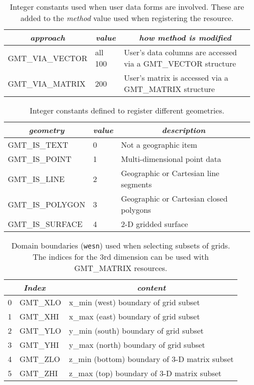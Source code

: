 \documentclass[11pt]{report}
\begin{document}
\begin{table}[h]
\small
\centering
\begin{tabular}{|l|l|l|} \hline
\multicolumn{1}{|c|}{\emph{approach}} & \multicolumn{1}{c|}{\emph{value}} & \multicolumn{1}{c|}{\emph{how method is modified}} \\ \hline
GMT\_VIA\_VECTOR	&all	100	&       User's data columns are accessed via a GMT\_VECTOR structure \\ \hline
GMT\_VIA\_MATRIX	&	200	&       User's matrix is accessed via a GMT\_MATRIX structure \\ \hline
\end{tabular}
\caption{Integer constants used when user data forms are involved.  These are added
to the \emph{method} value used when registering the resource.}
\label{tbl:via}
\end{table}

\begin{table}[h]
\small
\centering
\begin{tabular}{|l|l|l|} \hline
\multicolumn{1}{|c|}{\emph{geometry}} & \multicolumn{1}{c|}{\emph{value}} & \multicolumn{1}{c|}{\emph{description}} \\ \hline
GMT\_IS\_TEXT		&	0	&       Not a geographic item \\ \hline
GMT\_IS\_POINT		&	1	&       Multi-dimensional point data \\ \hline
GMT\_IS\_LINE		&	2	&       Geographic or Cartesian line segments \\ \hline
GMT\_IS\_POLYGON	&	3	&       Geographic or Cartesian closed polygons \\ \hline
GMT\_IS\_SURFACE	&	4	&       2-D gridded surface \\ \hline
\end{tabular}
\caption{Integer constants defined to register different geometries.}
\label{tbl:geometry}
\end{table}

\begin{table}[h]
\small
\centering
\begin{tabular}{|c|l|l|} \hline
\multicolumn{2}{|c|}{\emph{Index}} & \multicolumn{1}{c|}{\emph{content}} \\ \hline
0 & GMT\_XLO	&       x\_min (west) boundary of grid subset  \\ \hline
1 & GMT\_XHI	&       x\_max (east) boundary of grid subset  \\ \hline
2 & GMT\_YLO	&       y\_min (south) boundary of grid subset  \\ \hline
3 & GMT\_YHI	&       y\_max (north) boundary of grid subset  \\ \hline
4 & GMT\_ZLO	&       z\_min (bottom) boundary of 3-D matrix subset  \\ \hline
5 & GMT\_ZHI	&       z\_max (top) boundary of 3-D matrix subset  \\ \hline
\end{tabular}
\caption{Domain boundaries (\texttt{wesn}) used when selecting subsets of grids.  The indices for
the 3rd dimension can be used with GMT\_MATRIX resources.}
\label{tbl:wesn}
\end{table}
\end{document}
